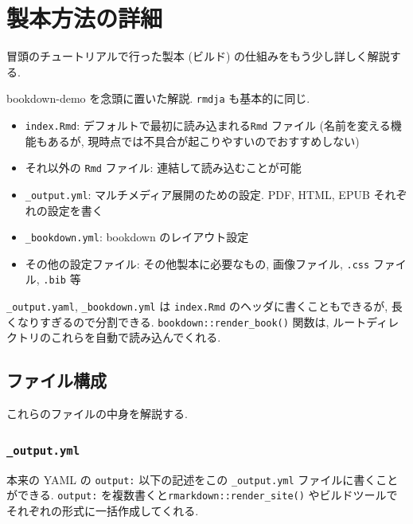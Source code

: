 \documentclass[
  xelatex,ja=standard,jafont=noto]{bxjsbook}
\providecommand{\tightlist}{%
  \setlength{\itemsep}{0pt}\setlength{\parskip}{0pt}}
\theoremstyle{definition}
\theoremstyle{definition}
\theoremstyle{definition}
\theoremstyle{definition}
\theoremstyle{remark}
\begin{document}
\hypertarget{ux88fdux672cux65b9ux6cd5ux306eux8a73ux7d30}{%
\chapter{製本方法の詳細}\label{ux88fdux672cux65b9ux6cd5ux306eux8a73ux7d30}}

冒頭のチュートリアルで行った製本 (ビルド)
の仕組みをもう少し詳しく解説する.

bookdown-demo を念頭に置いた解説. \texttt{rmdja} も基本的に同じ.

\begin{itemize}
\tightlist
\item
  \texttt{index.Rmd}: デフォルトで最初に読み込まれる\texttt{Rmd}
  ファイル (名前を変える機能もあるが,
  現時点では不具合が起こりやすいのでおすすめしない)
\item
  それ以外の \texttt{Rmd} ファイル: 連結して読み込むことが可能
\item
  \texttt{\_output.yml}: マルチメディア展開のための設定. PDF, HTML, EPUB
  それぞれの設定を書く
\item
  \texttt{\_bookdown.yml}: bookdown のレイアウト設定
\item
  その他の設定ファイル: その他製本に必要なもの, 画像ファイル,
  \texttt{.css} ファイル, \texttt{.bib} 等
\end{itemize}

\texttt{\_output.yaml}, \texttt{\_bookdown.yml} は \texttt{index.Rmd}
のヘッダに書くこともできるが, 長くなりすぎるので分割できる.
\texttt{bookdown::render\_book()} 関数は,
ルートディレクトリのこれらを自動で読み込んでくれる.

\hypertarget{ux30d5ux30a1ux30a4ux30ebux69cbux6210}{%
\section{ファイル構成}\label{ux30d5ux30a1ux30a4ux30ebux69cbux6210}}

これらのファイルの中身を解説する.

\hypertarget{output.yml}{%
\subsection{\texorpdfstring{\texttt{\_output.yml}}{\_output.yml}}\label{output.yml}}

本来の YAML の \texttt{output:} 以下の記述をこの \texttt{\_output.yml}
ファイルに書くことができる. \texttt{output:}
を複数書くと\texttt{rmarkdown::render\_site()}
やビルドツールでそれぞれの形式に一括作成してくれる.
\end{document}
